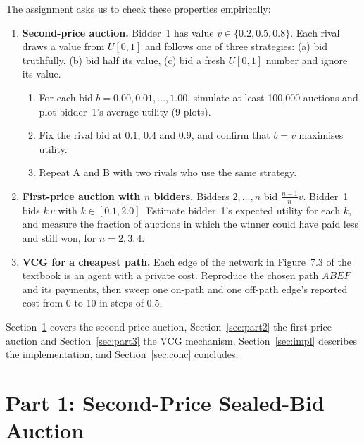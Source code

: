 \documentclass[11pt,a4paper]{article}
\begin{document}
The assignment asks us to check these properties empirically:
\begin{enumerate}[leftmargin=*,itemsep=0.2em]
  \item \textbf{Second-price auction.} Bidder~1 has value $v\in\{0.2,0.5,0.8\}$. Each rival draws a value from $U[0,1]$ and follows one of three strategies: (a) bid truthfully, (b) bid half its value, (c) bid a fresh $U[0,1]$ number and ignore its value.
  \begin{enumerate}[label=\Alph*.,itemsep=0.1em]
    \item For each bid $b=0.00,0.01,\dots,1.00$, simulate at least 100{,}000 auctions and plot bidder~1's average utility (9 plots).
    \item Fix the rival bid at $0.1$, $0.4$ and $0.9$, and confirm that $b=v$ maximises utility.
    \item Repeat A and B with two rivals who use the same strategy.
  \end{enumerate}
  \item \textbf{First-price auction with $n$ bidders.} Bidders $2,\dots,n$ bid $\frac{n-1}{n}v$. Bidder~1 bids $k\,v$ with $k\in[0.1,2.0]$. Estimate bidder~1's expected utility for each $k$, and measure the fraction of auctions in which the winner could have paid less and still won, for $n=2,3,4$.
  \item \textbf{VCG for a cheapest path.} Each edge of the network in Figure~7.3 of the textbook is an agent with a private cost. Reproduce the chosen path $ABEF$ and its payments, then sweep one on-path and one off-path edge's reported cost from 0 to 10 in steps of 0.5.
\end{enumerate}

Section~\ref{sec:part1} covers the second-price auction, Section~\ref{sec:part2} the first-price
auction and Section~\ref{sec:part3} the VCG mechanism. Section~\ref{sec:impl} describes the
implementation, and Section~\ref{sec:conc} concludes.

\section{Part 1: Second-Price Sealed-Bid Auction}\label{sec:part1}
\end{document}

